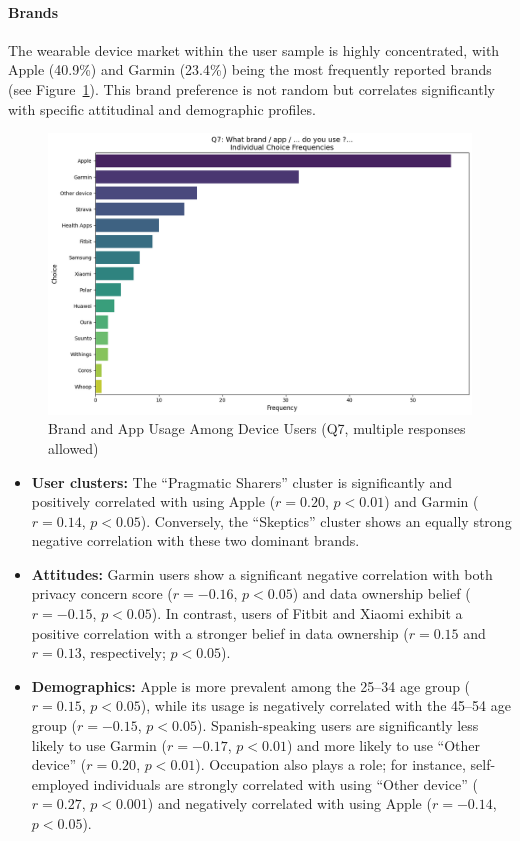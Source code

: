 	\paragraph{Brands}
	The wearable device market within the user sample is highly concentrated, with Apple (40.9\%) and Garmin (23.4\%) being the most frequently reported brands (see Figure~\ref{fig:Q7_brand_app}). This brand preference is not random but correlates significantly with specific attitudinal and demographic profiles.
	\begin{figure}[ht]\centering
		\includegraphics[width=0.7\linewidth]{figures/questions/Q7_multiple_choice.png}
		\caption{Brand and App Usage Among Device Users (Q7, multiple responses allowed)}
		\label{fig:Q7_brand_app}
	\end{figure}
	\begin{itemize}
		\item \textbf{User clusters:} The ``Pragmatic Sharers'' cluster is significantly and positively correlated with using Apple ($r = 0.20$, $p < 0.01$) and Garmin ($r = 0.14$, $p < 0.05$). Conversely, the ``Skeptics'' cluster shows an equally strong negative correlation with these two dominant brands.
		\item \textbf{Attitudes:} Garmin users show a significant negative correlation with both privacy concern score ($r = -0.16$, $p < 0.05$) and data ownership belief ($r = -0.15$, $p < 0.05$). In contrast, users of Fitbit and Xiaomi exhibit a positive correlation with a stronger belief in data ownership ($r = 0.15$ and $r = 0.13$, respectively; $p < 0.05$).
		\item \textbf{Demographics:} Apple is more prevalent among the 25--34 age group ($r = 0.15$, $p < 0.05$), while its usage is negatively correlated with the 45--54 age group ($r = -0.15$, $p < 0.05$). Spanish-speaking users are significantly less likely to use Garmin ($r = -0.17$, $p < 0.01$) and more likely to use ``Other device'' ($r = 0.20$, $p < 0.01$). Occupation also plays a role; for instance, self-employed individuals are strongly correlated with using ``Other device'' ($r = 0.27$, $p < 0.001$) and negatively correlated with using Apple ($r = -0.14$, $p < 0.05$).
	\end{itemize}
